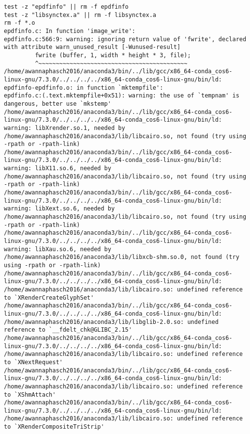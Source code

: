 \documentclass[11pt]{article}
\begin{document}
\begin{enumerate}
\begin{enumerate}
\begin{verbatim}
test -z "epdfinfo" || rm -f epdfinfo
test -z "libsynctex.a" || rm -f libsynctex.a
rm -f *.o
epdfinfo.c: In function 'image_write':
epdfinfo.c:566:9: warning: ignoring return value of 'fwrite', declared with attribute warn_unused_result [-Wunused-result]
         fwrite (buffer, 1, width * height * 3, file);
         ^~~~~~~~~~~~~~~~~~~~~~~~~~~~~~~~~~~~~~~~~~~~
/home/awannaphasch2016/anaconda3/bin/../lib/gcc/x86_64-conda_cos6-linux-gnu/7.3.0/../../../../x86_64-conda_cos6-linux-gnu/bin/ld: epdfinfo-epdfinfo.o: in function `mktempfile':
epdfinfo.c:(.text.mktempfile+0x51): warning: the use of `tempnam' is dangerous, better use `mkstemp'
/home/awannaphasch2016/anaconda3/bin/../lib/gcc/x86_64-conda_cos6-linux-gnu/7.3.0/../../../../x86_64-conda_cos6-linux-gnu/bin/ld: warning: libXrender.so.1, needed by /home/awannaphasch2016/anaconda3/lib/libcairo.so, not found (try using -rpath or -rpath-link)
/home/awannaphasch2016/anaconda3/bin/../lib/gcc/x86_64-conda_cos6-linux-gnu/7.3.0/../../../../x86_64-conda_cos6-linux-gnu/bin/ld: warning: libX11.so.6, needed by /home/awannaphasch2016/anaconda3/lib/libcairo.so, not found (try using -rpath or -rpath-link)
/home/awannaphasch2016/anaconda3/bin/../lib/gcc/x86_64-conda_cos6-linux-gnu/7.3.0/../../../../x86_64-conda_cos6-linux-gnu/bin/ld: warning: libXext.so.6, needed by /home/awannaphasch2016/anaconda3/lib/libcairo.so, not found (try using -rpath or -rpath-link)
/home/awannaphasch2016/anaconda3/bin/../lib/gcc/x86_64-conda_cos6-linux-gnu/7.3.0/../../../../x86_64-conda_cos6-linux-gnu/bin/ld: warning: libXau.so.6, needed by /home/awannaphasch2016/anaconda3/lib/libxcb-shm.so.0, not found (try using -rpath or -rpath-link)
/home/awannaphasch2016/anaconda3/bin/../lib/gcc/x86_64-conda_cos6-linux-gnu/7.3.0/../../../../x86_64-conda_cos6-linux-gnu/bin/ld: /home/awannaphasch2016/anaconda3/lib/libcairo.so: undefined reference to `XRenderCreateGlyphSet'
/home/awannaphasch2016/anaconda3/bin/../lib/gcc/x86_64-conda_cos6-linux-gnu/7.3.0/../../../../x86_64-conda_cos6-linux-gnu/bin/ld: /home/awannaphasch2016/anaconda3/lib/libglib-2.0.so: undefined reference to `__fdelt_chk@GLIBC_2.15'
/home/awannaphasch2016/anaconda3/bin/../lib/gcc/x86_64-conda_cos6-linux-gnu/7.3.0/../../../../x86_64-conda_cos6-linux-gnu/bin/ld: /home/awannaphasch2016/anaconda3/lib/libcairo.so: undefined reference to `XNextRequest'
/home/awannaphasch2016/anaconda3/bin/../lib/gcc/x86_64-conda_cos6-linux-gnu/7.3.0/../../../../x86_64-conda_cos6-linux-gnu/bin/ld: /home/awannaphasch2016/anaconda3/lib/libcairo.so: undefined reference to `XShmAttach'
/home/awannaphasch2016/anaconda3/bin/../lib/gcc/x86_64-conda_cos6-linux-gnu/7.3.0/../../../../x86_64-conda_cos6-linux-gnu/bin/ld: /home/awannaphasch2016/anaconda3/lib/libcairo.so: undefined reference to `XRenderCompositeTriStrip'

\end{verbatim}
\end{enumerate}
\end{enumerate}
\end{document}
